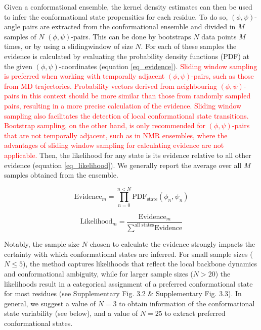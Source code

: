 Given a conformational ensemble, the kernel density estimates can then be used to infer the conformational state propensities for each residue. To do so, $(\phi, \psi)$-angle pairs  are extracted from the conformational ensemble and divided in $M$ samples of $N$ $(\phi, \psi)$-pairs. This can be done by \glspl{bootstrap} $N$ data points $M$ times, or by using a \gls{slidingwindow} of size $N$. For each of these samples the evidence is calculated by evaluating the probability density functions (PDF) at the given $(\phi, \psi)$-coordinates (equation \ref{eq_evidence}). \textcolor{red}{Sliding window sampling is preferred when working with temporally adjacent $(\phi, \psi)$-pairs, such as those from MD trajectories. Probability vectors derived from neighbouring $(\phi, \psi)$-pairs in this context should be more similar than those from randomly sampled pairs, resulting in a more precise calculation of the evidence. Sliding window sampling also facilitates the detection of local conformational state transitions. Bootstrap sampling, on the other hand, is only recommended for $(\phi, \psi)$-pairs that are not temporally adjacent, such as in NMR ensembles, where the advantages of sliding window sampling for calculating evidence are not applicable.} Then, the likelihood for any state is its evidence relative to all other evidence (equation \ref{eq_likelihood}). We generally report the average over all $M$ samples obtained from the ensemble.



\begin{equation}
\label{eq_evidence}
\text{Evidence}_m = \prod \limits_{n=0}^{ n < N} \text{PDF}_{\text{state}} (\phi_n, \psi_n)
\end{equation}

\begin{equation}
\label{eq_likelihood}
\text{Likelihood}_m = \frac { 
    \text{Evidence}_m
} {
    \sum\limits^{\text{all states}} \text{Evidence}
}
\end{equation}

Notably, the sample size $N$ chosen to calculate the evidence strongly impacts the certainty with which conformational states are inferred. For small sample sizes ($N \le 5$), the method captures likelihoods that reflect the local backbone dynamics and conformational ambiguity, while for larger sample sizes ($N > 20$) the likelihoods result in a categorical assignment of a preferred conformational state for most residues (see Supplementary Fig. 3.2 \& Supplementary Fig. 3.3).
In general, we suggest a value of $N = 3$ to obtain information of the conformational state variability (see below), and a value of $N = 25$ to extract preferred conformational states. 


